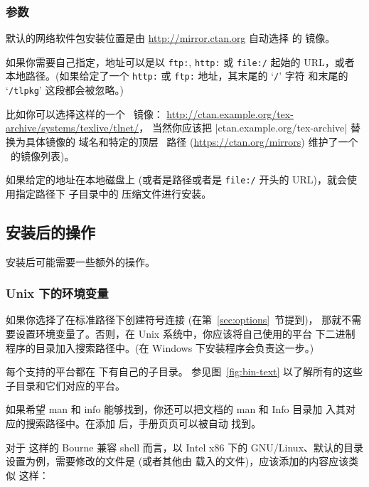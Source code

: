 \documentclass{article}
\begin{document}
\subsubsection{ 参数}
\label{sec:location}

默认的网络软件包安装位置是由 \url{http://mirror.ctan.org} 自动选择
的 \CTAN{} 镜像。

如果你需要自己指定，地址可以是以 \texttt{ftp:}, \texttt{http:} 或
\texttt{file:/} 起始的 URL，或者本地路径。(如果给定了一个
\texttt{http:} 或 \texttt{ftp:} 地址，其末尾的 `\texttt{/}' 字符
和末尾的 `\texttt{/tlpkg}' 这段都会被忽略。)

比如你可以选择这样的一个 \CTAN\ 镜像：
\url{http://ctan.example.org/tex-archive/systems/texlive/tlnet/}，
当然你应该把 |ctan.example.org/tex-archive| 替换为具体镜像的
域名和特定的顶层 \CTAN\ 路径 (\url{https://ctan.org/mirrors})
维护了一个 \CTAN\ 的镜像列表)。

如果给定的地址在本地磁盘上 (或者是路径或者是 \texttt{file:/}
开头的 URL)，就会使用指定路径下  子目录中的
压缩文件进行安装。

\subsection{安装后的操作}
\label{sec:postinstall}

安装后可能需要一些额外的操作。

\subsubsection{Unix 下的环境变量}
\label{sec:env}

如果你选择了在标准路径下创建符号连接 (在第~\ref{sec:options}~节提到)，
那就不需要设置环境变量了。否则，在 Unix 系统中，你应该将自己使用的平台
下二进制程序的目录加入搜索路径中。(在 Windows 下安装程序会负责这一步。)

每个支持的平台都在  下有自己的子目录。
参见图~\ref{fig:bin-text} 以了解所有的这些子目录和它们对应的平台。

如果希望 man 和 info 能够找到，你还可以把文档的 man 和 Info 目录加
入其对应的搜索路径中。在添加  后，手册页页可以被自动
找到。

对于  这样的 Bourne 兼容 shell 而言，以 Intel x86 下的
GNU/Linux、默认的目录设置为例，需要修改的文件是 
(或者其他由  载入的文件)，应该添加的内容应该类似
这样：

\end{document}
